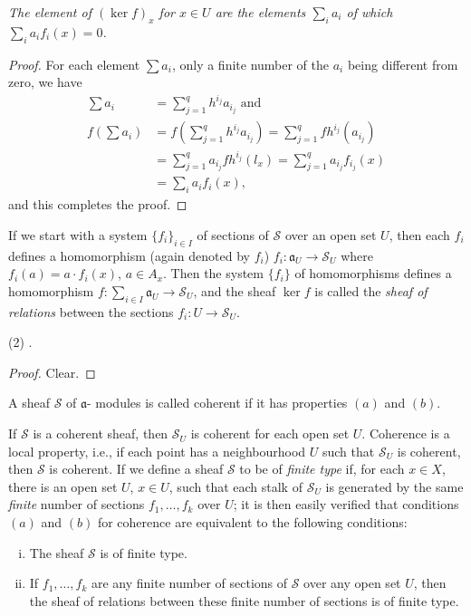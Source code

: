 \textit{The element of $(\ker f)_x$ for $x \in U$ are the elements 
  $\sum_i a_i$ of which $\sum_i a_i f_i (x)=0$.} 

\begin{proof}
For each element $\sum a_i$, only a finite number of the $a_i$ being
different from zero, we have 
\begin{align*}
\sum a_i & = \sum^q_{j=1} h^{i_j} a_{i_j} \text{ and }\\
f(\sum a_i) & = f (\sum^q_{j=1}h^{i_j} a_{i_j}) = \sum^q_{j=1} f
h^{i_j}(a_{i_j})\\ 
& = \sum^q_{j=1} a_{i_j} f h^{i_j}(l_x)=
\sum^q_{j=1}a_{i_j}f_{i_j}(x)\\ 
& = \sum_i a_i f_i (x),
\end{align*}
and this completes the proof.
\end{proof}

If we start with a system $\{f_i\}_{i \in I}$ of sections of
$\mathscr{S}$ over an open set $U$, then each $f_i$ defines a
homomorphism (again denoted by $f_i$) $f_i :\mathfrak{a}_U \to
\mathscr{S}_U$ where $f_i (a) = a \cdot f_i(x)$, $a \in A_x$. Then the
system $\{f_i\}$ of homomorphisms defines a homomorphism $f :
\sum\limits_{i \in I} \mathfrak{a}_U \to \mathscr{S}_U$, and the sheaf
$\ker f$ is called the \textit{sheaf of relations} between the
sections $f_i : U \to \mathscr{S}_U$.  

(2) . 

\begin{proof}
Clear.
\end{proof}

\begin{defi*}%
 A sheaf $\mathscr{S}$ of $\mathfrak{a}$- modules is called coherent
 if it   has properties $(a)$ and $(b)$.  
\end{defi*}

\begin{note*}
 If $\mathscr{S}$ is a coherent sheaf, then $\mathscr{S}_U$
is coherent for each open set $U$. Coherence is a local property,
i.e., if each point has a neighbourhood $U$ such that
$\mathscr{S}_U$ is coherent, then $\mathscr{S}$ is coherent. If we
define a sheaf $\mathscr{S}$ to be of \textit{finite type} if, for
each $x \in X$, there is an open set $U$, $x \in U$, such that each
stalk of $\mathscr{S}_U$ is generated by the same \textit{finite}
number of sections $f_1, \ldots,f_k$ over $U$; it is then easily
verified that conditions $(a)$ and $(b)$ for coherence are equivalent
to the following conditions: 
\begin{enumerate}[(i)]
\item The sheaf $\mathscr{S}$ is of finite type.

\item If $f_1, \ldots,f_k$ are any finite number of sections of
  $\mathscr{S}$ over any open set $U$, then the sheaf of relations
  between these finite number of sections is of finite type. 
\end{enumerate}
\end{note*}

